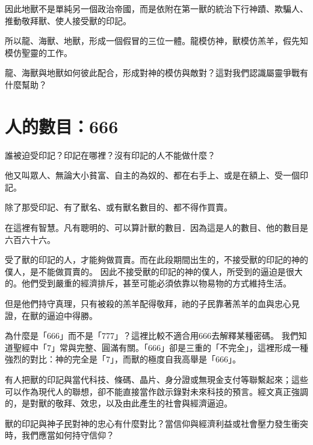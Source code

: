 因此地獸不是單純另一個政治帝國，而是依附在第一獸的統治下行神蹟、欺騙人、推動敬拜獸、使人接受獸的印記。

所以龍、海獸、地獸，形成一個假冒的三位一體。龍模仿神，獸模仿羔羊，假先知模仿聖靈的工作。

\begin{ReaderQuestion}
龍、海獸與地獸如何彼此配合，形成對神的模仿與敵對？這對我們認識屬靈爭戰有什麼幫助？
\end{ReaderQuestion}

\section{人的數目：666}

\begin{ScriptureBox2}{誰被迫受印記？印記在哪裡？沒有印記的人不能做什麼？}

\item[13:16] 他又叫眾人、無論大小貧富、自主的為奴的、都在右手上、或是在額上、受一個印記。

\item[13:17] 除了那受印記、有了獸名、或有獸名數目的、都不得作買賣。

\item[13:18] 在這裡有智慧。凡有聰明的、可以算計獸的數目．因為這是人的數目、他的數目是六百六十六。

\end{ScriptureBox2}

受了獸的印記的人，才能夠做買賣。而在此段期間出生的，不接受獸的印記的神的僕人，是不能做買賣的。
因此不接受獸的印記的神的僕人，所受到的逼迫是很大的。他們受到嚴重的經濟排斥，甚至可能必須依靠以物易物的方式維持生活。

但是他們持守真理，只有被殺的羔羊配得敬拜，祂的子民靠著羔羊的血與忠心見證，在獸的逼迫中得勝。

為什麼是「666」而不是「777」？這裡比較不適合用666去解釋某種密碼。
我們知道聖經中「7」常與完整、圓滿有關。「666」卻是三重的「不完全」，這裡形成一種強烈的對比：神的完全是「7」，而獸的極度自我高舉是「666」。

有人把獸的印記與當代科技、條碼、晶片、身分證或無現金支付等聯繫起來；這些可以作為現代人的聯想，卻不能直接當作啟示錄對未來科技的預言。經文真正強調的，是對獸的敬拜、效忠，以及由此產生的社會與經濟逼迫。

\begin{ReaderQuestion}
獸的印記與神子民對神的忠心有什麼對比？當信仰與經濟利益或社會壓力發生衝突時，我們應當如何持守信仰？
\end{ReaderQuestion}



